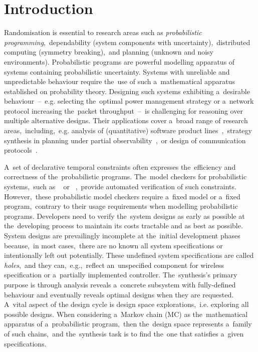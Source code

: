 \chapter{Introduction}

Randomisation is essential to research areas such as \textit{probabilistic programming},~dependability (system components with uncertainty),~distributed computing (symmetry breaking),~and planning (unknown and noisy environments).
Probabilistic programs are powerful modelling apparatus of systems containing probabilistic uncertainty.
Systems with unreliable and unpredictable behaviour require the~use of such a~mathematical apparatus established on probability theory.
Designing such systems exhibiting a~desirable behaviour \,--\, e.g. selecting the~optimal power management strategy or a~network protocol increasing the~packet throughput \,--\, is challenging for reasoning over multiple alternative designs.
Their applications cover a~broad range of research areas,~including,~e.g. analysis of (quantitative) software product lines~\cite{spl1,spl2},~strategy synthesis in planning under partial observability~\cite{pomdp1,pomdp2},~or design of communication protocols~\cite{herman1,herman2}.

A~set of declarative temporal constraints often expresses the~efficiency and correctness of the~probabilistic programs.
The~model checkers for probabilistic systems,~such as \storm{}~\cite{STORM} or \prism{}~\cite{KNP11},~provide automated verification of such constraints.
However,~these probabilistic model checkers require a~fixed model or a~fixed program,~contrary to their usage requirements when modelling probabilistic programs.
Developers need to verify the~system designs as early as possible at the~developing process to maintain its costs tractable and as best as possible.
System designs are prevailingly incomplete at the~initial development phases because,~in most cases,~there are no known all system specifications or intentionally left out potentially.
These undefined system specifications are called \textit{holes},~and they can,~e.g.,~reflect an~unspecified component for wireless specification or a~partially implemented controller.
The~synthesis's primary purpose is through analysis reveals a~concrete subsystem with fully-defined behaviour and eventually reveals optimal designs when they are requested.
A~vital aspect of the design cycle is design space explorations,~i.e. exploring all possible designs.
When considering a~Markov chain (MC) as the~mathematical apparatus of a~probabilistic program,~then the~design space represents a~family of such chains,~and the~synthesis task is to find the~one that satisfies a~given specifications.

